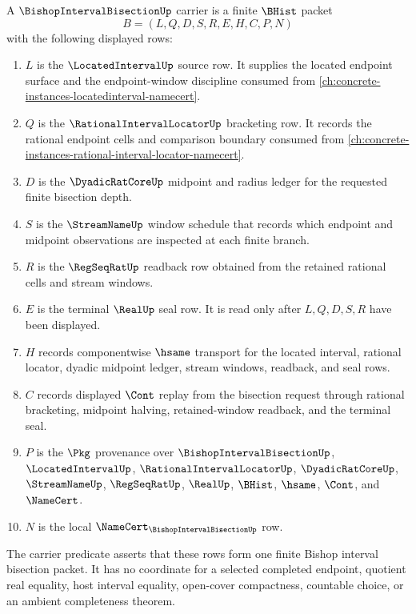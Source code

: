 \begin{definition}
\label{def:bishop-interval-bisection-carrier}
A $\BishopIntervalBisectionUp$ carrier is a finite $\BHist$ packet
$$
B=(L,Q,D,S,R,E,H,C,P,N)
$$
with the following displayed rows:
\begin{enumerate}
\item $L$ is the $\LocatedIntervalUp$ source row. It supplies the located endpoint surface and the endpoint-window discipline consumed from \autoref{ch:concrete-instances-locatedinterval-namecert}.
\item $Q$ is the $\RationalIntervalLocatorUp$ bracketing row. It records the rational endpoint cells and comparison boundary consumed from \autoref{ch:concrete-instances-rational-interval-locator-namecert}.
\item $D$ is the $\DyadicRatCoreUp$ midpoint and radius ledger for the requested finite bisection depth.
\item $S$ is the $\StreamNameUp$ window schedule that records which endpoint and midpoint observations are inspected at each finite branch.
\item $R$ is the $\RegSeqRatUp$ readback row obtained from the retained rational cells and stream windows.
\item $E$ is the terminal $\RealUp$ seal row. It is read only after $L,Q,D,S,R$ have been displayed.
\item $H$ records componentwise $\hsame$ transport for the located interval, rational locator, dyadic midpoint ledger, stream windows, readback, and seal rows.
\item $C$ records displayed $\Cont$ replay from the bisection request through rational bracketing, midpoint halving, retained-window readback, and the terminal seal.
\item $P$ is the $\Pkg$ provenance over $\BishopIntervalBisectionUp$, $\LocatedIntervalUp$, $\RationalIntervalLocatorUp$, $\DyadicRatCoreUp$, $\StreamNameUp$, $\RegSeqRatUp$, $\RealUp$, $\BHist$, $\hsame$, $\Cont$, and $\NameCert$.
\item $N$ is the local $\NameCert_{\BishopIntervalBisectionUp}$ row.
\end{enumerate}
The carrier predicate asserts that these rows form one finite Bishop interval bisection packet. It has no coordinate for a selected completed endpoint, quotient real equality, host interval equality, open-cover compactness, countable choice, or an ambient completeness theorem.
\end{definition}

